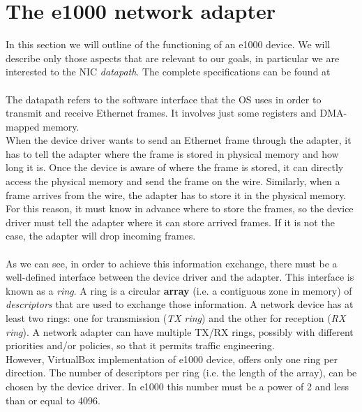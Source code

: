 \documentclass[a4paper, 12pt, titlepage]{report}
\begin{document}
\section{The e1000 network adapter} \label{sec:e1000_adapter}
In this section we will outline of the functioning of an e1000 device. We will describe only those aspects that are relevant to our goals, in particular we are interested to the NIC \textit{datapath}. The complete specifications can be found at~\cite{e1000}
\\
\\
The datapath refers to the software interface that the OS uses in order to transmit and receive Ethernet frames. It involves just some registers and DMA-mapped memory.
\\
When the device driver wants to send an Ethernet frame through the adapter, it has to tell the adapter where the frame is stored in physical memory and how long it is. Once the device is aware of where the frame is stored, it can directly access the physical memory and send the frame on the wire. Similarly, when a frame arrives from the wire, the adapter has to store it in the physical memory. For this reason, it must know in advance where to store the frames, so the device driver must tell the adapter where it can store arrived frames. If it is not the case, the adapter will drop incoming frames.
\\
\\
As we can see, in order to achieve this information exchange, there must be a well-defined interface between the device driver and the adapter. This interface is known as a \textit{ring}. A ring is a circular \textbf{array} (i.e. a contiguous zone in memory) of \textit{descriptors} that are used to exchange  those information. A network device has at least two rings: one for transmission (\textit{TX ring}) and the other for reception (\textit{RX ring}). A network adapter can have multiple TX/RX rings, possibly with different priorities and/or policies, so that it permits traffic engineering.
\\
However, VirtualBox implementation of e1000 device, offers only one ring per direction. The number of descriptors per ring (i.e. the length of the array), can be chosen by the device driver. In e1000 this number must be a power of 2 and less than or equal to 4096.
\end{document}
